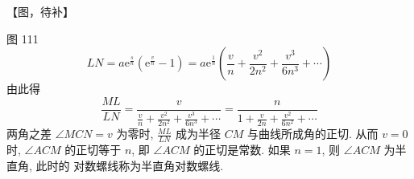 【图，待补】

图 111 
\[
L N=a \mathrm{e}^{\frac{s}{n}}\left(\mathrm{e}^{\frac{v}{n}}-1\right)=a \mathrm{e}^{\frac{1}{n}}\left(\frac{v}{n}+\frac{v^{2}}{2 n^{2}}+\frac{v^{3}}{6 n^{3}}+\cdots\right)
\]
由此得
\[
\frac{M L}{L N}=\frac{v}{\frac{v}{n}+\frac{v^{2}}{2 n^{2}}+\frac{v^{3}}{6 n^{3}}+\cdots}=\frac{n}{1+\frac{v}{2 n}+\frac{v^{2}}{6 n^{2}}+\cdots}
\]
两角之差 $\angle M C N=v$ 为零时, $\frac{M L}{L N}$ 成为半径 $C M$ 与曲线所成角的正切. 从而 $v=0$ 时, $\angle A C M$ 的正切等于 $n$, 即 $\angle A C M$ 的正切是常数. 如果 $n=1$, 则 $\angle A C M$ 为半直角, 此时的 对数螺线称为半直角对数螺线. 

